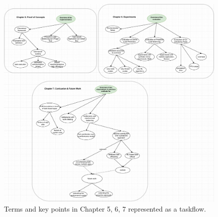 \begin{figure}[t]
  \centering
  \includegraphics[scale=0.45]{./pictures/thesis_structure/taskflow_chapter567.pdf}
	\caption{Terms and key points in Chapter 5, 6, 7 represented as a taskflow.}
	\label{fig:thesistaskflow_chapter567}
\end{figure}





